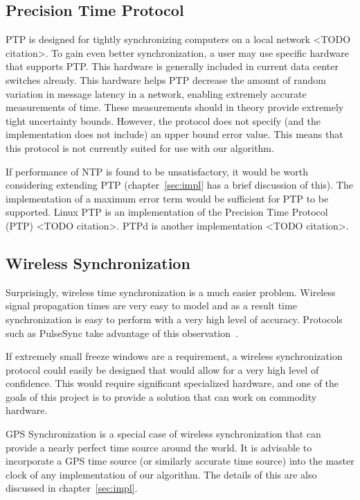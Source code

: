 \subsection{Precision Time Protocol}

PTP is designed for tightly synchronizing computers on a local network
<TODO citation>. To gain even better synchronization, a user may use
specific hardware that supports PTP. This hardware is generally
included in current data center switches already. This hardware helps
PTP decrease the amount of random variation in message latency in a
network, enabling extremely accurate measurements of time. These
measurements should in theory provide extremely tight uncertainty
bounds. However, the protocol does not specify (and the implementation
does not include) an upper bound error value. This means that this
protocol is not currently suited for use with our algorithm.

If performance of NTP is found to be unsatisfactory, it would be worth
considering extending PTP (chapter~\ref{sec:impl} has a brief discussion
of this). The implementation of a maximum error term would be
sufficient for PTP to be supported. Linux PTP is an implementation of
the Precision Time Protocol (PTP) <TODO citation>. PTPd is another
implementation <TODO citation>.

\subsection{Wireless Synchronization}

Surprisingly, wireless time synchronization is a much easier
problem. Wireless signal propagation times are very easy to model and
as a result time synchronization is easy to perform with a very high
level of accuracy. Protocols such as PulseSync take advantage of this
observation~\citep{lenzen_optimal_2009}.

If extremely small freeze windows are a requirement, a wireless
synchronization protocol could easily be designed that would allow for
a very high level of confidence. This would require significant
specialized hardware, and one of the goals of this project is to
provide a solution that can work on commodity hardware. 

GPS Synchronization is a special case of wireless synchronization that
can provide a nearly perfect time source around the world. It is
advisable to incorporate a GPS time source (or similarly accurate time
source) into the master clock of any implementation of our
algorithm. The details of this are also discussed in
chapter~\ref{sec:impl}.

